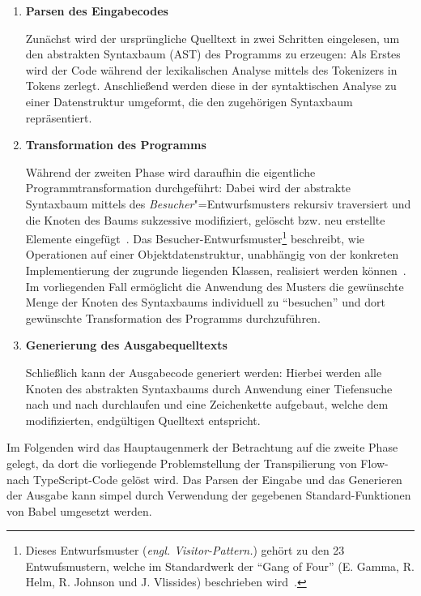 \begin{enumerate}
  \item \textbf{Parsen des Eingabecodes}

    Zunächst wird der ursprüngliche Quelltext in zwei Schritten eingelesen, um den abstrakten Syntaxbaum (AST) des Programms zu erzeugen: Als Erstes wird der Code während der lexikalischen Analyse mittels des Tokenizers in Tokens zerlegt. Anschließend werden diese in der syntaktischen Analyse zu einer Datenstruktur umgeformt, die den zugehörigen Syntaxbaum repräsentiert.
    \\

  \item \textbf{Transformation des Programms}

    Während der zweiten Phase wird daraufhin die eigentliche Programmtransformation durchgeführt: Dabei wird der abstrakte Syntaxbaum mittels des \emph{Besucher}"=Entwurfsmusters rekursiv traversiert und die Knoten des Baums sukzessive modifiziert, gelöscht bzw. neu erstellte Elemente eingefügt~\autocite{BABEL_HANDBOOK}. Das Besucher-Entwurfsmuster\footnote{Dieses Entwurfsmuster (\emph{engl. Visitor-Pattern.}) gehört zu den 23 Entwufsmustern, welche im Standardwerk  der \enquote{Gang of Four} (E. Gamma, R. Helm, R. Johnson und J. Vlissides) beschrieben wird~\autocite[306\psqq]{GAMMA:1994}.} beschreibt, wie Operationen auf einer Objektdatenstruktur, unabhängig von der konkreten Implementierung der zugrunde liegenden Klassen, realisiert werden können~\autocite[634\psq]{Freeman:2004}. Im vorliegenden Fall ermöglicht die Anwendung des Musters die gewünschte Menge der Knoten des Syntaxbaums individuell zu \enquote{besuchen} und dort gewünschte Transformation des Programms durchzuführen.
    \\

  \item \textbf{Generierung des Ausgabequelltexts}

    Schließlich kann der Ausgabecode generiert werden: Hierbei werden alle Knoten des abstrakten Syntaxbaums durch Anwendung einer Tiefensuche nach und nach durchlaufen und eine Zeichenkette aufgebaut, welche dem modifizierten, endgültigen Quelltext entspricht.
\end{enumerate}

Im Folgenden wird das Hauptaugenmerk der Betrachtung auf die zweite Phase gelegt, da dort die vorliegende Problemstellung der Transpilierung von Flow- nach TypeScript-Code gelöst wird. Das Parsen der Eingabe und das Generieren der Ausgabe kann simpel durch Verwendung der gegebenen Standard-Funktionen von Babel umgesetzt werden.

